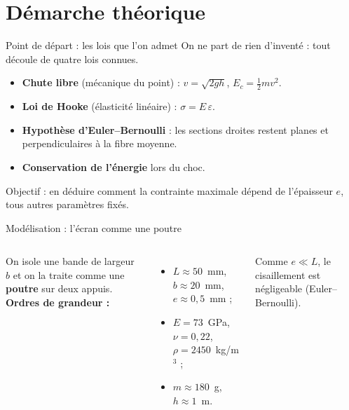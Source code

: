 \documentclass[11pt,aspectratio=169]{beamer}
\begin{document}
\section{Démarche théorique}

\begin{frame}{Point de départ : les lois que l'on admet}
  \footnotesize
  On ne part de rien d'inventé : tout découle de quatre lois connues.
  \begin{itemize}\itemsep3pt
    \item \textbf{Chute libre} (mécanique du point) : $v=\sqrt{2gh}$,
          $E_c=\tfrac12 mv^{2}$.
    \item \textbf{Loi de Hooke} (élasticité linéaire) : $\sigma=E\,\varepsilon$.
    \item \textbf{Hypothèse d'Euler--Bernoulli} : les sections droites restent
          planes et perpendiculaires à la fibre moyenne.
    \item \textbf{Conservation de l'énergie} lors du choc.
  \end{itemize}
  \medskip
  \centering\textcolor{verre}{Objectif : en déduire comment la contrainte
  maximale dépend de l'épaisseur $e$, tous autres paramètres fixés.}
\end{frame}

\begin{frame}{Modélisation : l'écran comme une poutre}
  \begin{columns}[c]
    \centering
    \footnotesize
    On isole une bande de largeur $b$ et on la traite comme une \textbf{poutre}
    sur deux appuis.
    \medskip\\
    \textbf{Ordres de grandeur :}
    \begin{itemize}\itemsep1pt
      \item $L\approx 50$~mm, $b\approx 20$~mm, $e\approx 0{,}5$~mm ;
      \item $E=73$~GPa, $\nu=0{,}22$, $\rho=2450$~kg/m$^3$ ;
      \item $m\approx 180$~g, $h\approx 1$~m.
    \end{itemize}
    Comme $e\ll L$, le cisaillement est négligeable (Euler--Bernoulli).
  \end{columns}
\end{frame}
\end{document}
